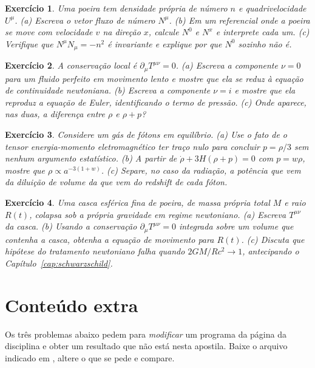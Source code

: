\documentclass[12pt,a4paper,oneside]{book}
\theoremstyle{rgplain}
\newtheorem{exercise}{Exercício}[chapter]
\theoremstyle{rgremark}
\begin{document}
\begin{exercise}
Uma poeira tem densidade própria de número $n$ e quadrivelocidade $U^\mu$.
(a) Escreva o vetor fluxo de número $N^\mu$. (b) Em um referencial onde a
poeira se move com velocidade $v$ na direção $x$, calcule $N^0$ e $N^x$ e
interprete cada um. (c) Verifique que $N^\mu N_\mu=-n^2$ é invariante e
explique por que $N^0$ sozinho não é.
\end{exercise}

\begin{exercise}
A conservação local é $\partial_\mu T^{\mu\nu}=0$. (a) Escreva a componente
$\nu=0$ para um fluido perfeito em movimento lento e mostre que ela se reduz
à equação de continuidade newtoniana. (b) Escreva a componente $\nu=i$ e
mostre que ela reproduz a equação de Euler, identificando o termo de pressão.
(c) Onde aparece, nas duas, a diferença entre $\rho$ e $\rho+p$?
\end{exercise}

\begin{exercise}
Considere um gás de fótons em equilíbrio. (a) Use o fato de o tensor
energia-momento eletromagnético ter traço nulo para concluir $p=\rho/3$ sem
nenhum argumento estatístico. (b) A partir de
$\dot\rho+3H(\rho+p)=0$ com $p=w\rho$, mostre que $\rho\propto a^{-3(1+w)}$.
(c) Separe, no caso da radiação, a potência que vem da diluição de volume da
que vem do redshift de cada fóton.
\end{exercise}

\begin{exercise}
Uma casca esférica fina de poeira, de massa própria total $M$ e raio $R(t)$,
colapsa sob a própria gravidade em regime newtoniano. (a) Escreva $T^{\mu\nu}$
da casca. (b) Usando a conservação $\partial_\mu T^{\mu\nu}=0$ integrada sobre
um volume que contenha a casca, obtenha a equação de movimento para $R(t)$.
(c) Discuta que hipótese do tratamento newtoniano falha quando
$2GM/Rc^2\to1$, antecipando o Capítulo~\ref{cap:schwarzschild}.
\end{exercise}


\section{Conteúdo extra}

Os três problemas abaixo pedem para \emph{modificar} um programa da página da disciplina e obter um resultado que não está nesta apostila. Baixe o arquivo indicado em \href{\rgsitecodigos}{\texttt{\rgsitecodigos}}, altere o que se pede e compare.
\end{document}
